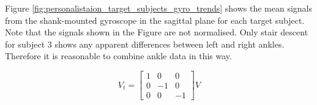 Figure \ref{fig:personalistaion_target_subjects_gyro_trends} shows the mean signals from the shank-mounted gyroscope in the sagittal plane for each target subject. Note that the signals shown in the Figure are not normalised. Only stair descent for subject 3 shows any apparent differences between left and right ankles. Therefore it is reasonable to combine ankle data in this way.

\begin{equation}
    V_t = \begin{bmatrix}
    1 & 0 & 0 \\
    0 & -1 & 0 \\
    0 & 0 & -1
    \end{bmatrix} V
\label{eqn:left-right-transformation}
\end{equation}

